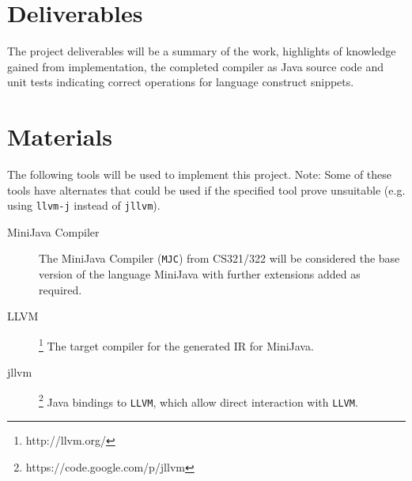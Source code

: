 \documentclass[12pt]{article}
\begin{document}
\section*{Deliverables}
The project deliverables will be a summary of the work, highlights of knowledge gained from implementation, the completed compiler as Java source code and unit tests indicating correct operations for language construct snippets.

\section*{Materials}
The following tools will be used to implement this project. Note: Some of these tools have alternates that could be used if the specified tool prove unsuitable (e.g. using \texttt{llvm-j} instead of \texttt{jllvm}).

\begin{description}
\item[MiniJava Compiler]
	The MiniJava Compiler (\texttt{MJC}) from CS321/322 will be considered the base version of the language MiniJava with further extensions added as required.

\item[LLVM]\footnote{http://llvm.org/} The target compiler for the generated IR for MiniJava.

\item[jllvm]\footnote{https://code.google.com/p/jllvm}
Java bindings to \texttt{LLVM}, which allow direct interaction with \texttt{LLVM}.

\end{description}
\end{document}
